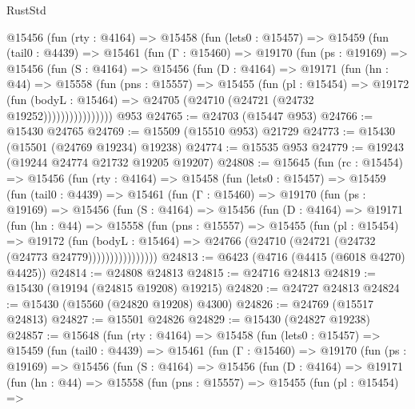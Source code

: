 \begin{lexlean}{RustStd}
\begin{coremodule}
{\begin{coremodule}
{{{{{{{{{{{{{{{{{{{{{{{{{{{{{{{{{{{{{{{{{{{{{{{{{{{{{{{{{{{{      @15456
        (fun (rty : @4164) =>
        @15458
          (fun (lets0 : @15457) =>
          @15459
            (fun (tail0 : @4439) =>
            @15461
              (fun (Γ : @15460) =>
              @19170
                (fun (ps : @19169) =>
                @15456
                  (fun (S : @4164) =>
                  @15456
                    (fun (D : @4164) =>
                    @19171
                      (fun (hn : @44) =>
                      @15558
                        (fun (pns : @15557) =>
                        @15455
                          (fun (pl : @15454) =>
                          @19172
                            (fun (bodyL : @15464) =>
                            @24705 (@24710 (@24721 (@24732 @19252))))))))))))))))
    @953
@24765 := @24703 (@15447 @953)
@24766 := @15430 @24765
@24769 := @15509 (@15510 @953) @21729
@24773 := @15430 (@15501 (@24769 @19234) @19238)
@24774 := @15535 @953
@24779 := @19243 (@19244 @24774 @21732 @19205 @19207)
@24808 := @15645
    (fun (rc : @15454) =>
    @15456
      (fun (rty : @4164) =>
      @15458
        (fun (lets0 : @15457) =>
        @15459
          (fun (tail0 : @4439) =>
          @15461
            (fun (Γ : @15460) =>
            @19170
              (fun (ps : @19169) =>
              @15456
                (fun (S : @4164) =>
                @15456
                  (fun (D : @4164) =>
                  @19171
                    (fun (hn : @44) =>
                    @15558
                      (fun (pns : @15557) =>
                      @15455
                        (fun (pl : @15454) =>
                        @19172
                          (fun (bodyL : @15464) =>
                          @24766 (@24710 (@24721 (@24732 (@24773 @24779))))))))))))))))
@24813 := @6423 (@4716 (@4415 (@6018 @4270) @4425))
@24814 := @24808 @24813
@24815 := @24716 @24813
@24819 := @15430 (@19194 (@24815 @19208) @19215)
@24820 := @24727 @24813
@24824 := @15430 (@15560 (@24820 @19208) @4300)
@24826 := @24769 (@15517 @24813)
@24827 := @15501 @24826
@24829 := @15430 (@24827 @19238)
@24857 := @15648
    (fun (rty : @4164) =>
    @15458
      (fun (lets0 : @15457) =>
      @15459
        (fun (tail0 : @4439) =>
        @15461
          (fun (Γ : @15460) =>
          @19170
            (fun (ps : @19169) =>
            @15456
              (fun (S : @4164) =>
              @15456
                (fun (D : @4164) =>
                @19171
                  (fun (hn : @44) =>
                  @15558
                    (fun (pns : @15557) =>
                    @15455
                      (fun (pl : @15454) =>
}}}}}}}}}}}}}}}}}}}}}}}}}}}}}}}}}}}}}}}}}}}}}}}}}}}}}}}}}}}}
\end{coremodule}}
\end{coremodule}
\end{lexlean}
